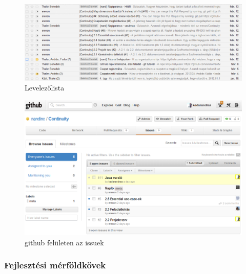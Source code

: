 	\begin{figure}[h]
		\begin{center}
			\includegraphics[scale=0.5]{resources/levlista.png}
			\caption{Levelezőlista}
		\end{center}
	\end{figure}
	\begin{figure}[h]
		\begin{center}
			\includegraphics[scale=0.5]{resources/issues.png}
			\caption{github felületen az issuek}
		\end{center}
	\end{figure}

    \subsubsection{Fejlesztési mérföldkövek}

